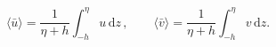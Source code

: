 \begin{equation}
	\langle\bar{u}\rangle = \frac{1}{\eta + h}\int_{-h}^{\eta}u \,\text{d}z \,,\qquad \langle\bar{v}\rangle = \frac{1}{\eta + h}\int_{-h}^{\eta}v \,\text{d}z.
\label{UVBar}
\end{equation}
